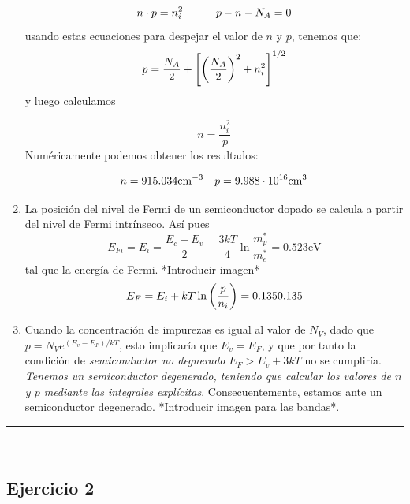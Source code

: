 \begin{enumerate}[label=\alph*)]
		      \begin{equation}
			      n\cdot p = n_i^2 \quad \quad \quad p-n-N_A = 0
		      \end{equation}
		      usando estas ecuaciones para despejar el valor de $n$ y $p$, tenemos que:
		      \begin{equation}
			      p = \frac{N_A}{2} + \left[ \left( \frac{N_A}{2} \right)^2 + n_i^2 \right]^{1/2}
		      \end{equation}
		      y luego calculamos

		      \begin{equation}
			      n = \frac{n_i^2}{p}
		      \end{equation}
		      Numéricamente podemos obtener los resultados:

		      \begin{equation}
			      n=915.034 \text{cm}^{-3} \quad p = 9.988 \cdot 10^{16} \text{cm}^3
		      \end{equation}


		\item La posición del nivel de Fermi de un semiconductor dopado se calcula a partir del nivel de Fermi intrínseco. Así pues
		      \begin{equation}
			      E_{Fi} = E_i = \frac{E_c+E_v}{2} + \frac{3 kT}{4} \ln \frac{m_p^*}{m_e^*} = 0.523 \text{eV}
		      \end{equation}
		      tal que la energía de Fermi. *Introducir imagen*
		      \begin{equation}
			      E_F = E_i + kT \ln \left( \frac{p}{n_i} \right) = 0.135 \text{0.135}
		      \end{equation}
		\item Cuando la concentración de impurezas es igual al valor de $N_V$, dado que $p=N_V e^{(E_v-E_F)/kT}$, esto implicaría que $E_v = E_F$, y que por tanto la condición de \textit{semiconductor no degnerado} $E_F>E_v + 3kT$ no se cumpliría. \textit{Tenemos un semiconductor degenerado, teniendo que calcular los valores de $n$ y $p$ mediante las integrales explícitas}. Consecuentemente, estamos ante un semiconductor degenerado. *Introducir imagen para las bandas*.
	\end{enumerate}

\rule{\textwidth}{0.1pt} \\[2pt]

\subsection{Ejercicio 2}

